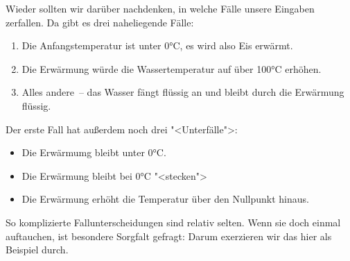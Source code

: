 %
Wieder sollten wir darüber nachdenken, in welche Fälle unsere
Eingaben zerfallen.  Da gibt es drei naheliegende Fälle:
%
\begin{enumerate}
\item Die Anfangstemperatur ist unter 0°C, es wird also Eis erwärmt.
\item Die Erwärmung würde die Wassertemperatur auf über 100°C erhöhen.
\item Alles andere~-- das Wasser fängt flüssig an und bleibt durch die
  Erwärmung flüssig.
\end{enumerate}
%
Der erste Fall hat außerdem noch drei "<Unterfälle">:
%
\begin{itemize}
\item Die Erwärmumg bleibt unter 0°C.
\item Die Erwärmung bleibt bei  0°C "<stecken">
\item Die Erwärmung erhöht die Temperatur über den Nullpunkt hinaus.
\end{itemize}
%
So komplizierte Fallunterscheidungen sind relativ selten. Wenn sie
doch einmal auftauchen, ist besondere Sorgfalt gefragt: Darum
exerzieren wir das hier als Beispiel durch.

